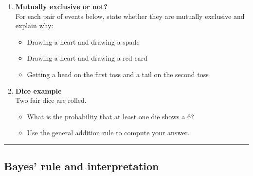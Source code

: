 \documentclass[
  letterpaper,
  DIV=11,
  numbers=noendperiod]{scrreprt}
\providecommand{\tightlist}{%
  \setlength{\itemsep}{0pt}\setlength{\parskip}{0pt}}
\begin{document}
\begin{enumerate}
\def\labelenumi{\arabic{enumi}.}
\setcounter{enumi}{12}
\tightlist
\item
  \textbf{Mutually exclusive or not?}\\
  For each pair of events below, state whether they are mutually
  exclusive and explain why:

  \begin{itemize}
  \tightlist
  \item
    Drawing a heart and drawing a spade\\
  \item
    Drawing a heart and drawing a red card\\
  \item
    Getting a head on the first toss and a tail on the second toss
  \end{itemize}
\item
  \textbf{Dice example}\\
  Two fair dice are rolled.

  \begin{itemize}
  \tightlist
  \item
    What is the probability that at least one die shows a 6?\\
  \item
    Use the general addition rule to compute your answer.
  \end{itemize}
\end{enumerate}

\begin{center}\rule{0.5\linewidth}{0.5pt}\end{center}

\subsection{Bayes' rule and
interpretation}\label{bayes-rule-and-interpretation}
\end{document}
